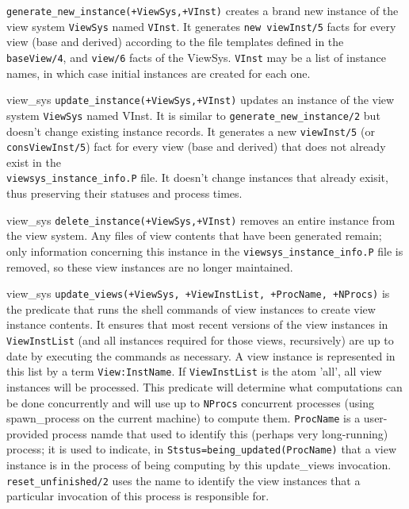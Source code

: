 \begin{description}

%
{\tt generate\_new\_instance(+ViewSys,+VInst)} creates a brand new
instance of the view system {\tt ViewSys} named {\tt VInst}.  It
generates {\tt new\ viewInst/5} facts for every view (base and
derived) according to the file templates defined in the {\tt
  baseView/4}, and {\tt view/6} facts of the ViewSys.  {\tt VInst} may
be a list of instance names, in which case initial instances are
created for each one.

{view\_sys}
{\tt update\_instance(+ViewSys,+VInst)} updates an instance of the
view system {\tt ViewSys} named VInst.  It is similar to
{\tt generate\_new\_instance/2} but doesn't change existing instance
records.  It generates a new {\tt viewInst/5} (or
{\tt consViewInst/5}) fact for every view (base and derived) that
does not already exist in the \\
{\tt viewsys\_instance\_info.P} file.  It
doesn't change instances that already exisit, thus preserving their
statuses and process times.  

{view\_sys}
%
{\tt delete\_instance(+ViewSys,+VInst)} removes an entire instance
from the view system.  Any files of view contents that have been
generated remain; only information concerning this instance in the
{\tt viewsys\_instance\_info.P} file is removed, so these view
instances are no longer maintained.

{view\_sys}
{\tt update\_views(+ViewSys, +ViewInstList, +ProcName, +NProcs)} is
the predicate that runs the shell commands of view instances to create
view instance contents.  It ensures that most recent versions of the
view instances in {\tt ViewInstList} (and all instances required for those
views, recursively) are up to date by executing the commands as
necessary.  A view instance is represented in this list by a term
{\tt View:InstName}.  If {\tt ViewInstList} is the atom 'all', all
view instances will be processed.  This predicate will determine what
computations can be done concurrently and will use up to {\tt NProcs}
concurrent processes (using spawn\_process on the current machine) to
compute them.  {\tt ProcName} is a user-provided process namde that
used to identify this (perhaps very long-running) process; it is used
to indicate, in {\tt Ststus=being\_updated(ProcName)} that a view
instance is in the process of being computing by this update\_views
invocation.  {\tt reset\_unfinished/2} uses the name to identify the
view instances that a particular invocation of this process is
responsible for.  


\end{description}
